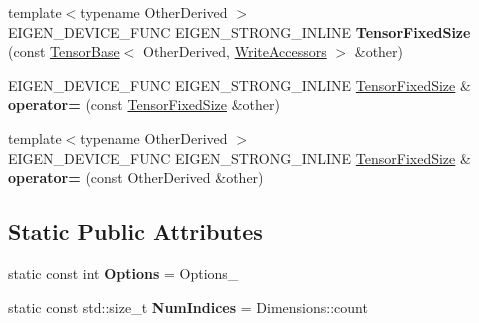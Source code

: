 \begin{DoxyCompactItemize}
\item 
\mbox{\label{class_eigen_1_1_tensor_fixed_size_a10cfeabe6c4136871f40e943967218c5}} 
{\footnotesize template$<$typename Other\+Derived $>$ }\\E\+I\+G\+E\+N\+\_\+\+D\+E\+V\+I\+C\+E\+\_\+\+F\+U\+NC E\+I\+G\+E\+N\+\_\+\+S\+T\+R\+O\+N\+G\+\_\+\+I\+N\+L\+I\+NE {\bfseries Tensor\+Fixed\+Size} (const \hyperlink{class_eigen_1_1_tensor_base}{Tensor\+Base}$<$ Other\+Derived, \hyperlink{group__enums_gga9f93eac38eb83deb0e8dbd42ddf11d5da2c59ef3697d65866c3a8e16eda7881ab}{Write\+Accessors} $>$ \&other)
\item 
\mbox{\label{class_eigen_1_1_tensor_fixed_size_a37f3d41eb9116c5687b39e5d8170ab28}} 
E\+I\+G\+E\+N\+\_\+\+D\+E\+V\+I\+C\+E\+\_\+\+F\+U\+NC E\+I\+G\+E\+N\+\_\+\+S\+T\+R\+O\+N\+G\+\_\+\+I\+N\+L\+I\+NE \hyperlink{class_eigen_1_1_tensor_fixed_size}{Tensor\+Fixed\+Size} \& {\bfseries operator=} (const \hyperlink{class_eigen_1_1_tensor_fixed_size}{Tensor\+Fixed\+Size} \&other)
\item 
\mbox{\label{class_eigen_1_1_tensor_fixed_size_adb1cd1f443a0f3e7f74dad6248df3b30}} 
{\footnotesize template$<$typename Other\+Derived $>$ }\\E\+I\+G\+E\+N\+\_\+\+D\+E\+V\+I\+C\+E\+\_\+\+F\+U\+NC E\+I\+G\+E\+N\+\_\+\+S\+T\+R\+O\+N\+G\+\_\+\+I\+N\+L\+I\+NE \hyperlink{class_eigen_1_1_tensor_fixed_size}{Tensor\+Fixed\+Size} \& {\bfseries operator=} (const Other\+Derived \&other)
\end{DoxyCompactItemize}
\subsection*{Static Public Attributes}
\begin{DoxyCompactItemize}
\item 
\mbox{\label{class_eigen_1_1_tensor_fixed_size_a0bf78c0fd7d6f4d469ad970efe7367fa}} 
static const int {\bfseries Options} = Options\+\_\+
\item 
\mbox{\label{class_eigen_1_1_tensor_fixed_size_aeee04fdbb8559df7bfae79f0eac8596c}} 
static const std\+::size\+\_\+t {\bfseries Num\+Indices} = Dimensions\+::count
\end{DoxyCompactItemize}
